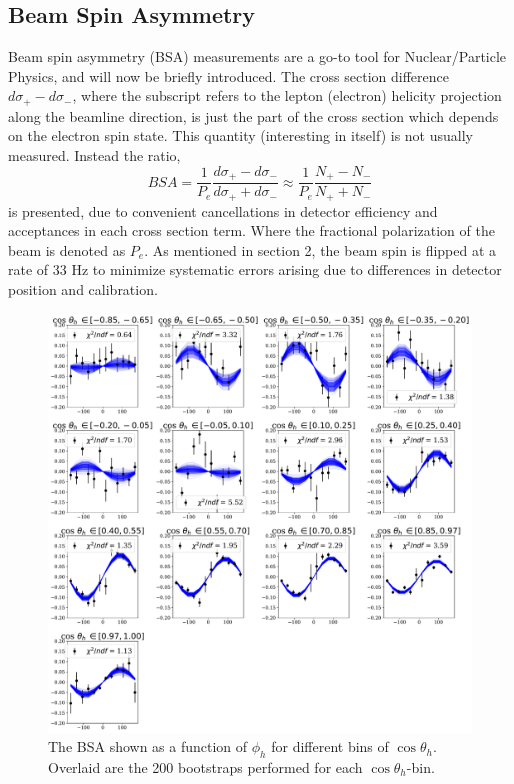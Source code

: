 \subsection{Beam Spin Asymmetry}
Beam spin asymmetry (BSA) measurements are a go-to tool for Nuclear/Particle Physics, and will now be briefly introduced.  The cross section difference $d\sigma_{+} - d\sigma_{-}$, where the subscript refers to the lepton (electron) helicity projection along the beamline direction, is just the part of the cross section which depends on the electron spin state.  This quantity (interesting in itself) is not usually measured.  Instead the ratio,
\begin{equation}
	BSA = \frac{1}{P_e} \frac{d\sigma_{+} - d\sigma_{-}}{d\sigma_{+} + d\sigma_{-}} \approx \frac{1}{P_e} \frac{N_+ - N_-}{N_+ + N_-}
\end{equation}    
is presented, due to convenient cancellations in detector efficiency and acceptances in each cross section term.  Where the fractional polarization of the beam is denoted as $P_e$.  As mentioned in section 2, the beam spin is flipped at a rate of 33 Hz to minimize systematic errors arising due to differences in detector position and calibration.  
\\

\begin{figure}
  \begin{center}
    \includegraphics[width=\columnwidth]{image/default_phi_bootstraps.pdf}
    \caption{The BSA shown as a function of $\phi_h$ for different bins of $\cos \theta_h$.  Overlaid are the 200 bootstraps performed for each $\cos \theta_h$-bin.}
  \end{center}
\end{figure}

